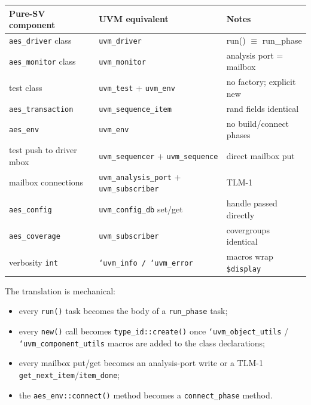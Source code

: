 \documentclass[conference,10pt,a4paper]{IEEEtran}
\begin{document}
\begin{table}[h]
\centering
\small
\begin{tabular}{p{} p{} p{}}
\toprule
\textbf{Pure-SV component} & \textbf{UVM equivalent} & \textbf{Notes} \\
\midrule
\texttt{aes\_driver} class      & \texttt{uvm\_driver}                  & run() $\equiv$ run\_phase \\
\texttt{aes\_monitor} class     & \texttt{uvm\_monitor}                 & analysis port = mailbox \\
test class                      & \texttt{uvm\_test} + \texttt{uvm\_env}& no factory; explicit new \\
\texttt{aes\_transaction}       & \texttt{uvm\_sequence\_item}          & rand fields identical \\
\texttt{aes\_env}               & \texttt{uvm\_env}                     & no build/connect phases \\
test push to driver mbox        & \texttt{uvm\_sequencer} + \texttt{uvm\_sequence} & direct mailbox put \\
mailbox connections             & \texttt{uvm\_analysis\_port} + \texttt{uvm\_subscriber} & TLM-1 \\
\texttt{aes\_config}            & \texttt{uvm\_config\_db} set/get      & handle passed directly \\
\texttt{aes\_coverage}          & \texttt{uvm\_subscriber}              & covergroups identical \\
verbosity \texttt{int}          & \texttt{`uvm\_info / `uvm\_error}     & macros wrap \texttt{\$display} \\
\bottomrule
\end{tabular}
\end{table}

The translation is mechanical:
\begin{itemize}[leftmargin=*]
  \item every \texttt{run()} task becomes the body of a
        \texttt{run\_phase} task;
  \item every \texttt{new()} call becomes \texttt{type\_id::create()}
        once \texttt{`uvm\_object\_utils} / \texttt{`uvm\_component\_utils}
        macros are added to the class declarations;
  \item every mailbox put/get becomes an analysis-port write or a TLM-1
        \texttt{get\_next\_item}/\texttt{item\_done};
  \item the \texttt{aes\_env::connect()} method becomes a
        \texttt{connect\_phase} method.
\end{itemize}
\end{document}
